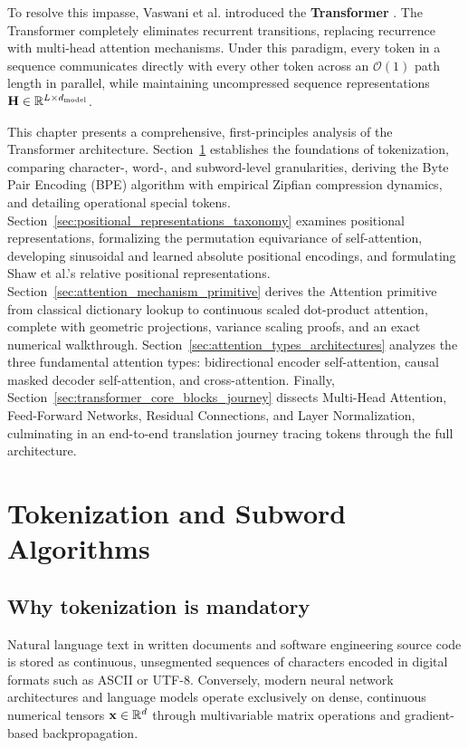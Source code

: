 \documentclass[../../main.tex]{subfiles}
\begin{document}
To resolve this impasse, Vaswani et al. introduced the \textbf{Transformer} \cite{vaswani2017}. The Transformer completely eliminates recurrent transitions, replacing recurrence with multi-head attention mechanisms. Under this paradigm, every token in a sequence communicates directly with every other token across an $\mathcal{O}(1)$ path length in parallel, while maintaining uncompressed sequence representations $\mathbf{H} \in \mathbb{R}^{L \times d_{\text{model}}}$.

This chapter presents a comprehensive, first-principles analysis of the Transformer architecture. Section~\ref{sec:tokenization_taxonomy_bpe} establishes the foundations of tokenization, comparing character-, word-, and subword-level granularities, deriving the Byte Pair Encoding (BPE) algorithm with empirical Zipfian compression dynamics, and detailing operational special tokens. Section~\ref{sec:positional_representations_taxonomy} examines positional representations, formalizing the permutation equivariance of self-attention, developing sinusoidal and learned absolute positional encodings, and formulating Shaw et al.'s relative positional representations. Section~\ref{sec:attention_mechanism_primitive} derives the Attention primitive from classical dictionary lookup to continuous scaled dot-product attention, complete with geometric projections, variance scaling proofs, and an exact numerical walkthrough. Section~\ref{sec:attention_types_architectures} analyzes the three fundamental attention types: bidirectional encoder self-attention, causal masked decoder self-attention, and cross-attention. Finally, Section~\ref{sec:transformer_core_blocks_journey} dissects Multi-Head Attention, Feed-Forward Networks, Residual Connections, and Layer Normalization, culminating in an end-to-end translation journey tracing tokens through the full architecture.

\clearpage
\section{Tokenization and Subword Algorithms}
\label{sec:tokenization_taxonomy_bpe}

\subsection{Why tokenization is mandatory}
\label{subsec:why_tokenize}

Natural language text in written documents and software engineering source code is stored as continuous, unsegmented sequences of characters encoded in digital formats such as ASCII or UTF-8. Conversely, modern neural network architectures and language models operate exclusively on dense, continuous numerical tensors $\mathbf{x} \in \mathbb{R}^d$ through multivariable matrix operations and gradient-based backpropagation.
\end{document}
